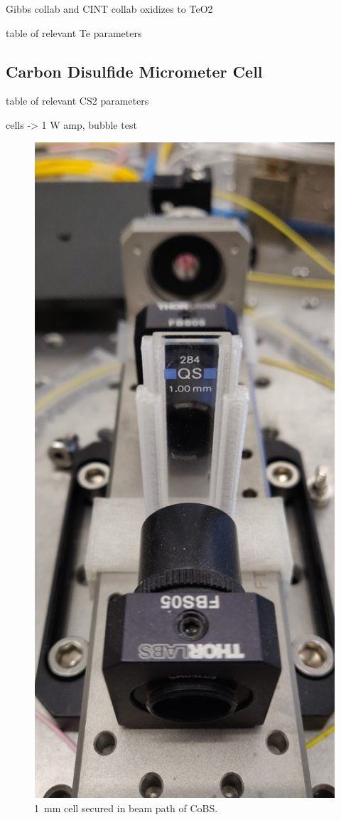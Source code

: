 Gibbs collab and CINT collab
oxidizes to TeO2

table of relevant Te parameters

\subsection{Carbon Disulfide Micrometer Cell}
\label{subsec:Raman:Target:CS2Cells}

table of relevant CS2 parameters

cells -> 1 W amp, bubble test

\begin{figure}[t]
  \centering
  \includegraphics[height=.8\textheight]{figs/4-Raman/1mmCS2.jpg}
  \caption{\SI{1}{\milli\meter}  cell secured in beam path of \acl{CoBS}.}
  \label{fig:Raman:1mmCS2}
\end{figure}

